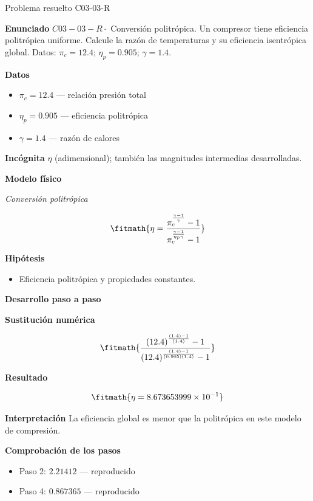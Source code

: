 \documentclass[10pt,openany]{book}
\begin{document}
\begin{studiumworked}{Problema resuelto C03-03-R}


\noindent\textbf{Enunciado}
\(C03-03-R \cdot\) Conversión politrópica. Un compresor tiene eficiencia politrópica uniforme. Calcule la razón de temperaturas y su eficiencia isentrópica global. Datos: \(\pi_c=12.4\); \(\eta_p=0.905\); \(\gamma=1.4\).

\noindent\textbf{Datos}
\begin{itemize}
\item $\pi_c = 12.4$ — relación presión total
\item $\eta_p = 0.905$ — eficiencia politrópica
\item $\gamma = 1.4$ — razón de calores
\end{itemize}

\noindent\textbf{Incógnita}
$\eta$ (adimensional); también las magnitudes intermedias desarrolladas.

\noindent\textbf{Modelo físico}

\noindent\textit{Conversión politrópica}

\[
\fitmath{\eta=\frac{\pi_c^{\frac{\gamma - 1}{\gamma}} - 1}{\pi_c^{\frac{\gamma - 1}{\eta_p \gamma}} - 1}}
\]

\noindent\textbf{Hipótesis}
\begin{itemize}
\item Eficiencia politrópica y propiedades constantes.
\end{itemize}

\noindent\textbf{Desarrollo paso a paso}



\noindent\textbf{Sustitución numérica}

\[
\fitmath{\frac{\left(12.4\right)^{\frac{\left(1.4\right) - 1}{\left(1.4\right)}} - 1}{\left(12.4\right)^{\frac{\left(1.4\right) - 1}{\left(0.905\right) \left(1.4\right)}} - 1}}
\]

\noindent\textbf{Resultado}

\[
\fitmath{\eta=8.673653999\times10^{-1}}
\]

\noindent\textbf{Interpretación}
La eficiencia global es menor que la politrópica en este modelo de compresión.

\noindent\textbf{Comprobación de los pasos}
\begin{itemize}
\item Paso 2: $2.21412$ — reproducido
\item Paso 4: $0.867365$ — reproducido
\end{itemize}


\end{studiumworked}
\end{document}
